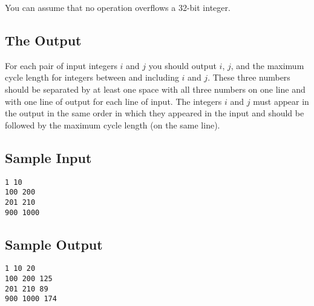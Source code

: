 You can assume that no operation overflows a 32-bit integer.


\subsection*{The Output}

For each pair of input integers $i$ and $j$ you should output $i$, $j$,
and the maximum cycle length for integers between and including
$i$ and $j$.  These three numbers
should be separated by at least one space with all three numbers on one
line and with one line of output for each line of input.  The integers
$i$ and $j$ must appear in the output in the same order in which they
appeared in the input and should be
followed by the maximum cycle length (on the same line).
\bigskip

\begin{multicols}{2}
\subsection*{Sample Input}
\begin{verbatim}
1 10
100 200
201 210
900 1000
\end{verbatim}

\subsection*{Sample Output}
\begin{verbatim}
1 10 20
100 200 125
201 210 89
900 1000 174
\end{verbatim}
\end{multicols}